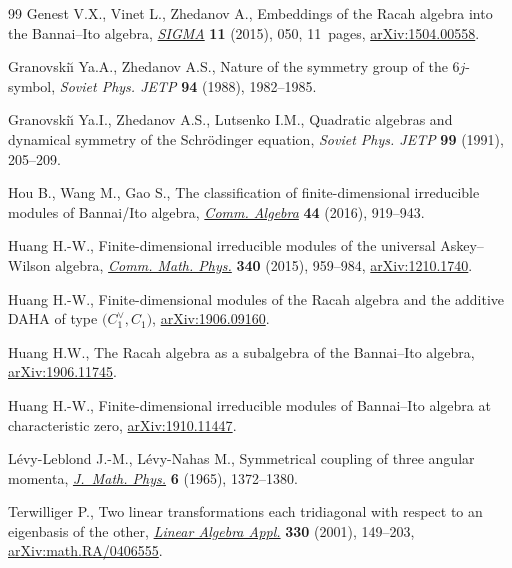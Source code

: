 \documentclass[pdftex]{sigma}
\numberwithin{equation}{section}
\begin{document}
\begin{thebibliography}{99}
Genest V.X., Vinet L., Zhedanov A., Embeddings of the {R}acah algebra into the
 {B}annai--{I}to algebra, \href{https://doi.org/10.3842/SIGMA.2015.050}{\textit{SIGMA}} \textbf{11} (2015), 050, 11~pages, \href{https://arxiv.org/abs/1504.00558}{arXiv:1504.00558}.

Granovski\u{\i} Ya.A., Zhedanov A.S., Nature of the symmetry group of the
 {$6j$}-symbol, \textit{Soviet Phys. JETP} \textbf{94} (1988), 1982--1985.

Granovski\u{\i} Ya.I., Zhedanov A.S., Lutsenko I.M., Quadratic algebras and
 dynamical symmetry of the {S}chr\"{o}dinger equation, \textit{Soviet Phys.
 JETP} \textbf{99} (1991), 205--209.

Hou B., Wang M., Gao S., The classification of finite-dimensional irreducible
 modules of {B}annai/{I}to algebra, \href{https://doi.org/10.1080/00927872.2014.990030}{\textit{Comm. Algebra}} \textbf{44} (2016), 919--943.

Huang H.-W., Finite-dimensional irreducible modules of the universal
 {A}skey--{W}ilson algebra, \href{https://doi.org/10.1007/s00220-015-2467-9}{\textit{Comm. Math. Phys.}} \textbf{340} (2015),
 959--984, \href{https://arxiv.org/abs/1210.1740}{arXiv:1210.1740}.

Huang H.-W., Finite-dimensional modules of the {R}acah algebra and the additive
 {DAHA} of type $\big(C_1^\vee,C_1\big)$, \href{https://arxiv.org/abs/1906.09160}{arXiv:1906.09160}.

Huang H.W., The {R}acah algebra as a subalgebra of the {B}annai--{I}to algebra, \href{https://arxiv.org/abs/1906.11745}{arXiv:1906.11745}.

Huang H.-W., Finite-dimensional irreducible modules of {B}annai--{I}to algebra
 at characteristic zero, \href{https://arxiv.org/abs/1910.11447}{arXiv:1910.11447}.

L\'{e}vy-Leblond J.-M., L\'{e}vy-Nahas M., Symmetrical coupling of three angular
 momenta, \href{https://doi.org/10.1063/1.1704786}{\textit{J.~Math. Phys.}} \textbf{6} (1965), 1372--1380.

Terwilliger P., Two linear transformations each tridiagonal with respect to an
 eigenbasis of the other, \href{https://doi.org/10.1016/S0024-3795(01)00242-7}{\textit{Linear Algebra Appl.}} \textbf{330} (2001), 149--203, \href{https://arxiv.org/abs/math.RA/0406555}{arXiv:math.RA/0406555}.

\end{thebibliography}\LastPageEnding
\end{document}
